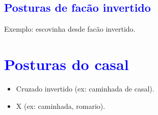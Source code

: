 \subsection{\textcolor{blue}{ Posturas de facão invertido}}

Exemplo: escovinha desde facão invertido.


\section{\textcolor{blue}{Posturas do casal}}

\begin{itemize}
\item Cruzado invertido (ex: caminhada de casal).
\item X (ex: caminhada, romario).
\end{itemize}
